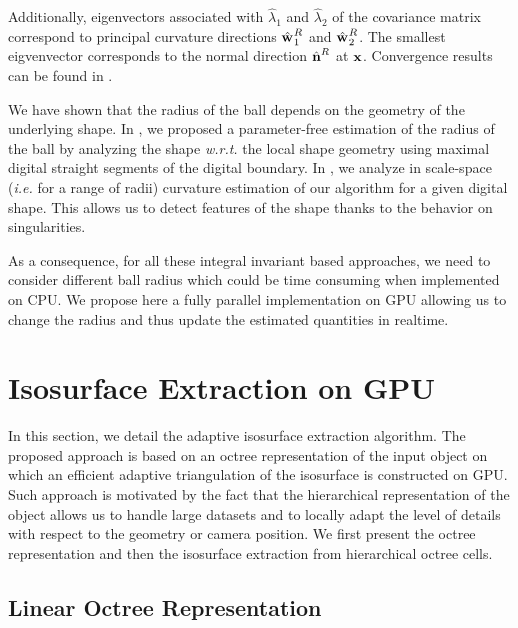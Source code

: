 \documentclass{llncs}
\newcommand{\ie}{\emph{i.e.} }
\newcommand{\wrt}{\emph{w.r.t.} }
\begin{document}
Additionally, eigenvectors associated with $\hat{\lambda}_1$ and
$\hat{\lambda}_2$ of the covariance matrix correspond to principal curvature
directions $\hat{\mathbf{w}_{}}_{1}^{R}$ and $\hat{\mathbf{w}_{}}_{2}^{R}$. The smallest eigvenvector
corresponds to the normal direction $\hat{\mathbf{n}{}}^{R}$ at $\mathbf{x}$. Convergence
results can be found in \cite{ChapterIICurvature}.

We have shown that the radius of the ball depends on the geometry of
the underlying shape. In \cite{DGCI2014}, we proposed a parameter-free
estimation of the radius of the ball by analyzing the shape \wrt the
local shape geometry using maximal digital straight segments of the
digital boundary. In \cite{SMI2015}, we analyze in scale-space (\ie
for a range of radii) curvature estimation of our algorithm for a
given digital shape. This allows us to detect features of the shape
thanks to the behavior on singularities.

As a consequence, for all these integral invariant based approaches,
we need to consider different ball radius which could be time
consuming when implemented on CPU. We propose here a fully parallel
implementation on GPU allowing us to change the radius and thus update
the estimated quantities in realtime.

\section{Isosurface Extraction on GPU}
\label{sec:isos-extr-gpu}

In this section, we detail the adaptive isosurface extraction
algorithm. The proposed approach is based on an octree representation
of the input object on which an efficient adaptive triangulation
of the isosurface is constructed on GPU. Such approach is motivated by
the fact that the hierarchical representation of the object allows us
to handle large datasets and to locally adapt the level of details
with respect to the geometry or camera position. We first present the
octree representation and then the isosurface extraction from
hierarchical octree cells.

\subsection{Linear Octree Representation}
\end{document}
